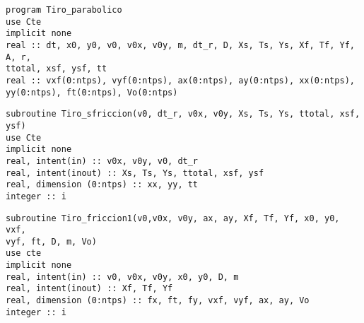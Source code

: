 \documentclass[12pt]{article}
\begin{document}
\begin{verbatim}
program Tiro_parabolico
use Cte
implicit none 
real :: dt, x0, y0, v0, v0x, v0y, m, dt_r, D, Xs, Ts, Ys, Xf, Tf, Yf, A, r, 
ttotal, xsf, ysf, tt
real :: vxf(0:ntps), vyf(0:ntps), ax(0:ntps), ay(0:ntps), xx(0:ntps), 
yy(0:ntps), ft(0:ntps), Vo(0:ntps)
\end{verbatim} 

\begin{verbatim}
subroutine Tiro_sfriccion(v0, dt_r, v0x, v0y, Xs, Ts, Ys, ttotal, xsf, ysf)
use Cte
implicit none
real, intent(in) :: v0x, v0y, v0, dt_r
real, intent(inout) :: Xs, Ts, Ys, ttotal, xsf, ysf
real, dimension (0:ntps) :: xx, yy, tt
integer :: i
\end{verbatim}

\begin{verbatim}
subroutine Tiro_friccion1(v0,v0x, v0y, ax, ay, Xf, Tf, Yf, x0, y0, vxf,
vyf, ft, D, m, Vo) 
use cte
implicit none
real, intent(in) :: v0, v0x, v0y, x0, y0, D, m
real, intent(inout) :: Xf, Tf, Yf
real, dimension (0:ntps) :: fx, ft, fy, vxf, vyf, ax, ay, Vo
integer :: i
\end{verbatim}
\end{document}
